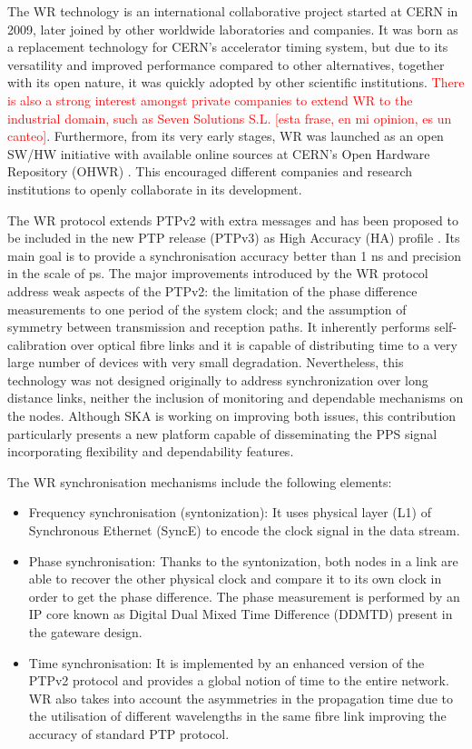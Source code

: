 The WR technology \cite{Wlostowski2011} is an international collaborative
project started at CERN in 2009, later joined by other worldwide laboratories and
companies. It was born as a replacement technology for CERN's accelerator timing system,
but due to its versatility and improved performance compared to other
alternatives, together with its open nature, it was quickly adopted by other
scientific institutions. \textcolor{red}{There is also a strong interest amongst private companies to
extend WR to the industrial domain, such as Seven Solutions S.L. \cite{sevensols:wr} [esta frase, en mi opinion, es un canteo]}.
Furthermore, from its very early stages, WR was launched as an open SW/HW
initiative with available online sources at CERN's Open Hardware Repository (OHWR)
\cite{ohwr:repo}. This encouraged different companies and research institutions
to openly collaborate in its development.

The WR protocol extends PTPv2 with extra messages and has been proposed to be
included in the new PTP release (PTPv3) as High Accuracy (HA) profile
\cite{wr:maciej-ptpv3-standard} . Its main goal is to provide a synchronisation
accuracy better than 1 ns and precision in the scale of ps. The major
improvements introduced by the WR protocol address weak aspects of the PTPv2:
the limitation of the phase difference measurements to one period of the system
clock; and the assumption of symmetry between transmission and reception
paths. It inherently performs self-calibration over optical fibre links and it
is capable of distributing time to a very large number of devices with very
small degradation. Nevertheless, this technology was not designed originally
to address synchronization over long distance links, neither the inclusion of monitoring and dependable mechanisms on the nodes. Although SKA is working on improving both issues, this contribution particularly presents a new platform capable of disseminating the PPS signal incorporating flexibility and dependability features. 

The WR synchronisation mechanisms include the following elements:

\begin{itemize} 
	\item {Frequency synchronisation (syntonization): It uses physical layer (L1) of Synchronous Ethernet (SyncE) to encode the clock signal in the data stream. } 

	\item {Phase synchronisation: Thanks to the syntonization, both nodes in a link are able to recover the other physical clock and compare it to its own clock in order to get the phase difference. The phase measurement is performed by an IP core known as Digital Dual Mixed Time Difference (DDMTD) present in the gateware design.} 
	
	\item {Time synchronisation: It is implemented by an enhanced version of the PTPv2 protocol and provides a global notion of time to the entire network. WR also takes into account the asymmetries in the propagation time due to the utilisation of different wavelengths in the same fibre link improving the accuracy of standard PTP protocol.} 
\end{itemize}


